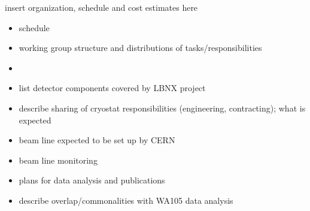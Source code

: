 insert organization, schedule and cost estimates here

\begin{itemize}
\item schedule

\item working group structure and distributions of tasks/responsibilities
\item

\item list detector components covered by LBNX project
\item describe sharing of cryostat responsibilities (engineering, contracting); what is expected 
\item beam line expected to be set up by CERN
\item beam line monitoring


\item plans for data analysis and publications
\item describe overlap/commonalities with WA105 data analysis


\end{itemize}
